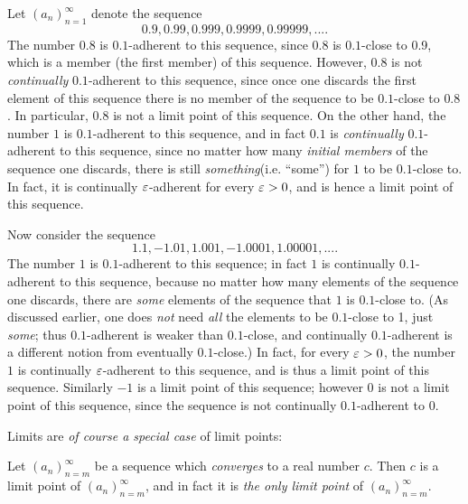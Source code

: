 \begin{example} \label{example 6.4.3}
Let \((a_n)_{n = 1}^{\infty}\) denote the sequence
\[
    0.9, 0.99, 0.999, 0.9999, 0.99999,....
\]
The number \(0.8\) is \(0.1\)-adherent to this sequence, since \(0.8\) is \(0.1\)-close to 0.9, which is a member (the first member) of this sequence.
However, \(0.8\) is not \emph{continually} \(0.1\)-adherent to this sequence, since once one discards the first element of this sequence there is no member of the sequence to be \(0.1\)-close to \(0.8\).
In particular, \(0.8\) is not a limit point of this sequence.
On the other hand, the number \(1\) is \(0.1\)-adherent to this sequence, and in fact \(0.1\) is \emph{continually} \(0.1\)-adherent to this sequence,
since no matter how many \emph{initial members} of the sequence one discards, there is still \emph{something}(i.e. ``some'') for \(1\) to be \(0.1\)-close to.
In fact, it is continually \(\varepsilon\)-adherent for every \(\varepsilon > 0\), and is hence a limit point of this sequence.
\end{example}

\begin{example} \label{example 6.4.4}
Now consider the sequence
\[
    1.1, -1.01, 1.001, -1.0001, 1.00001,....
\]
The number \(1\) is \(0.1\)-adherent to this sequence;
in fact \(1\) is continually \(0.1\)-adherent to this sequence,
because no matter how many elements of the sequence one discards, there are \emph{some} elements of the sequence that \(1\) is \(0.1\)-close to.
(As discussed earlier, one does \emph{not} need \emph{all} the elements to be \(0.1\)-close to 1, just \emph{some}; 
thus \(0.1\)-adherent is weaker than \(0.1\)-close, and continually \(0.1\)-adherent is a different notion from eventually \(0.1\)-close.)
In fact, for every \(\varepsilon > 0\), the number \(1\) is continually \(\varepsilon\)-adherent to this sequence, and is thus a limit point of this sequence.
Similarly \(-1\) is a limit point of this sequence;
however \(0\) is not a limit point of this sequence, since the sequence is not continually \(0.1\)-adherent to \(0\).
\end{example}

Limits are \emph{of course a special case} of limit points:

\begin{proposition}  \label{prop 6.4.5}
Let \((a_n)_{n = m}^{\infty}\) be a sequence which \emph{converges} to a real number \(c\).
Then \(c\) is a limit point of \((a_n)_{n = m}^{\infty}\), and in fact it is \emph{the only limit point} of \((a_n)_{n = m}^{\infty}\).
\end{proposition}

